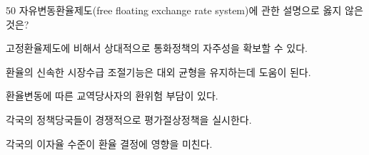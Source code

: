 \begin{question}{50}
자유변동환율제도(free floating exchange rate system)에 관한 설명으로 옳지 않은 것은?
\begin{choices}
  \item 고정환율제도에 비해서 상대적으로 통화정책의 자주성을 확보할 수 있다.
  \item 환율의 신속한 시장수급 조절기능은 대외 균형을 유지하는데 도움이 된다.
  \item 환율변동에 따른 교역당사자의 환위험 부담이 있다.
  \item 각국의 정책당국들이 경쟁적으로 평가절상정책을 실시한다.
  \item 각국의 이자율 수준이 환율 결정에 영향을 미친다.
\end{choices}
\end{question}
